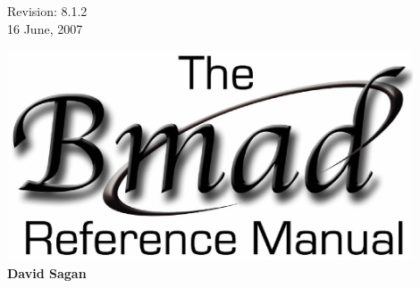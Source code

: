 \thispagestyle{empty}

\begin{flushright}
\large
  Revision: 8.1.2 \\
  16 June, 2007 \\
\end{flushright}

\vfill

{
\begin{center}
\includegraphics[width=12cm]{bmad-ref-manual.eps} \\
\vskip 0.3in
\huge\bf David Sagan
\end{center}
}

\vfill
\break

